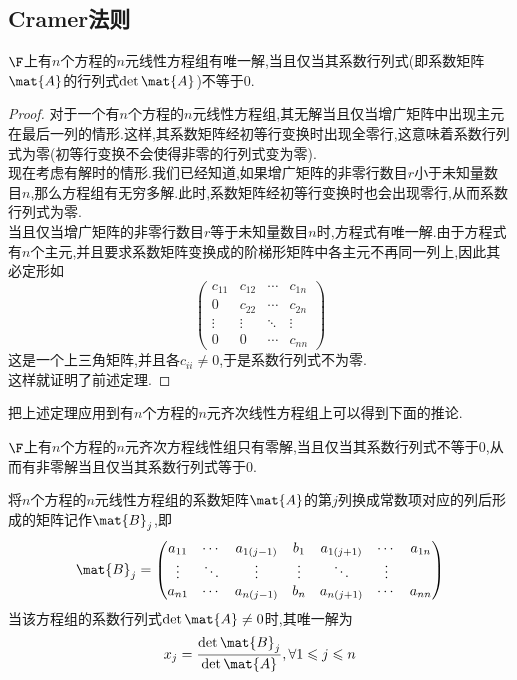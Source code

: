 \documentclass{ctexart}
\begin{document}
\subsection{Cramer法则}
\begin{theorem}
    $\F$上有$n$个方程的$n$元线性方程组有唯一解,当且仅当其系数行列式(即系数矩阵$\mat{A}$的行列式$\det\mat{A}$)不等于$0$.
\end{theorem}
\begin{proof}
    对于一个有$n$个方程的$n$元线性方程组,其无解当且仅当增广矩阵中出现主元在最后一列的情形.这样,其系数矩阵经初等行变换时出现全零行,这意味着系数行列式为零(初等行变换不会使得非零的行列式变为零).\\
    现在考虑有解时的情形.我们已经知道,如果增广矩阵的非零行数目$r$小于未知量数目$n$,那么方程组有无穷多解.此时,系数矩阵经初等行变换时也会出现零行,从而系数行列式为零.\\
    当且仅当增广矩阵的非零行数目$r$等于未知量数目$n$时,方程式有唯一解.由于方程式有$n$个主元,并且要求系数矩阵变换成的阶梯形矩阵中各主元不再同一列上,因此其必定形如
    \[\begin{pmatrix}
        c_{11}&c_{12}&\cdots&c_{1n}\\
        0&c_{22}&\cdots&c_{2n}\\
        \vdots&\vdots&\ddots&\vdots\\
        0&0&\cdots&c_{nn}
    \end{pmatrix}\]
    这是一个上三角矩阵,并且各$c_{ii}\neq0$,于是系数行列式不为零.\\
    这样就证明了前述定理.
\end{proof}
把上述定理应用到有$n$个方程的$n$元齐次线性方程组上可以得到下面的推论.
\begin{lemma}
    $\F$上有$n$个方程的$n$元齐次方程线性组只有零解,当且仅当其系数行列式不等于$0$,从而有非零解当且仅当其系数行列式等于$0$.
\end{lemma}
\begin{theorem}
    将$n$个方程的$n$元线性方程组的系数矩阵$\mat{A}$的第$j$列换成常数项对应的列后形成的矩阵记作$\mat{B}_j$,即
    \[\mat{B}_j=\begin{pmatrix}
        a_{11}&\cdots&a_{1(j-1)}&b_1&a_{1(j+1)}&\cdots&a_{1n}\\
        \vdots&\ddots&\vdots&\vdots&\ddots&\vdots\\
        a_{n1}&\cdots&a_{n(j-1)}&b_n&a_{n(j+1)}&\cdots&a_{nn}
    \end{pmatrix}\]
    当该方程组的系数行列式$\det\mat{A}\neq0$时,其唯一解为
    \[x_j=\dfrac{\det\mat{B}_j}{\det\mat{A}},\forall 1\leqslant j\leqslant n\]
\end{theorem}
\end{document}
